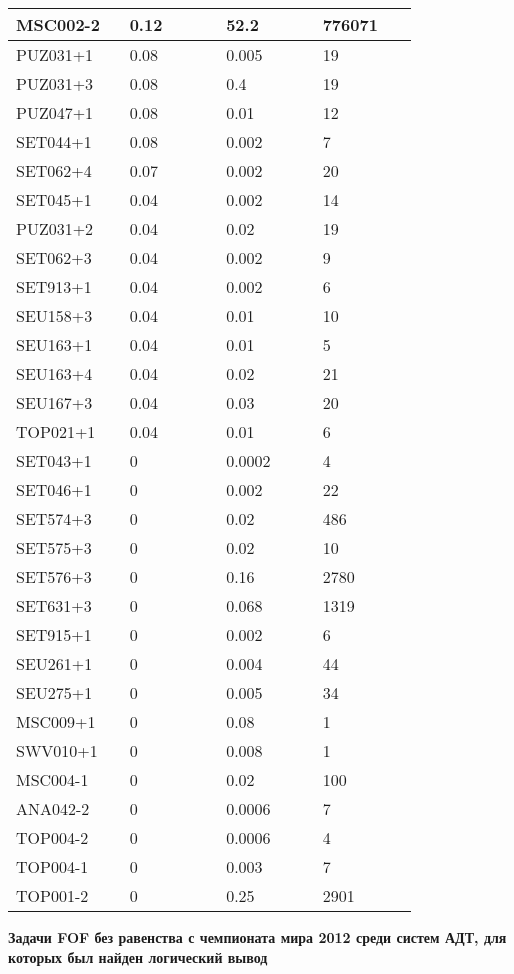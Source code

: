 \begin{longtable}[H]{|p{0.2\linewidth}|p{0.2\linewidth}|p{0.2\linewidth}|p{0.2\linewidth}|}
\hline
MSC002-2 &  0.12 &  52.2 &  776071 \\
\hline
PUZ031+1 &  0.08 &  0.005 &  19 \\
\hline
PUZ031+3 &  0.08 &  0.4 &  19 \\
\hline
PUZ047+1 &  0.08 &  0.01 &  12 \\
\hline
SET044+1 &  0.08 &  0.002 &  7 \\
\hline
SET062+4 &  0.07 &  0.002 &  20 \\
\hline
SET045+1 &  0.04 &  0.002 &  14 \\
\hline
PUZ031+2 &  0.04 &  0.02 &  19 \\
\hline
SET062+3 &  0.04 &  0.002 &  9 \\
\hline
SET913+1 &  0.04 &  0.002 &  6 \\
\hline
SEU158+3 &  0.04 &  0.01 &  10 \\
\hline
SEU163+1 &  0.04 &  0.01 &  5 \\
\hline
SEU163+4 &  0.04 &  0.02 &  21 \\
\hline
SEU167+3 &  0.04 &  0.03 &  20 \\
\hline
TOP021+1 &  0.04 &  0.01 &  6 \\
\hline
SET043+1 &  0 &  0.0002 &  4 \\
\hline
SET046+1 &  0 &  0.002 &  22 \\
\hline
SET574+3 &  0 &  0.02 &  486 \\
\hline
SET575+3 &  0 &  0.02 &  10 \\
\hline
SET576+3 &  0 &  0.16 &  2780 \\
\hline
SET631+3 &  0 &  0.068 &  1319 \\
\hline
SET915+1 &  0 &  0.002 &  6 \\
\hline
SEU261+1 &  0 &  0.004 &  44 \\
\hline
SEU275+1 &  0 &  0.005 &  34 \\
\hline
MSC009+1 &  0 &  0.08 &  1  \\
\hline
SWV010+1 &  0 & 0.008 &  1  \\
\hline
MSC004-1 &  0 &  0.02 &  100 \\
\hline
ANA042-2 & 0 & 0.0006 & 7 \\
\hline
TOP004-2 & 0 & 0.0006 & 4 \\
\hline
TOP004-1 & 0 & 0.003 & 7 \\
\hline
TOP001-2 & 0 & 0.25 & 2901 \\
\hline
\end{longtable}


\textbf{Задачи FOF без равенства с чемпионата мира 2012 среди систем АДТ, для которых был найден логический вывод}

